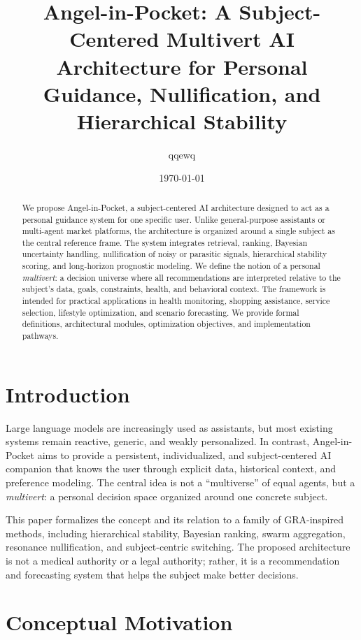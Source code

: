 \documentclass[11pt,a4paper]{article}
\title{Angel-in-Pocket: A Subject-Centered Multivert AI Architecture for Personal Guidance, Nullification, and Hierarchical Stability}
\author{qqewq}
\date{\today}
\begin{document}
\maketitle

\begin{abstract}
We propose Angel-in-Pocket, a subject-centered AI architecture designed to act as a personal guidance system for one specific user. Unlike general-purpose assistants or multi-agent market platforms, the architecture is organized around a single subject as the central reference frame. The system integrates retrieval, ranking, Bayesian uncertainty handling, nullification of noisy or parasitic signals, hierarchical stability scoring, and long-horizon prognostic modeling. We define the notion of a personal \emph{multivert}: a decision universe where all recommendations are interpreted relative to the subject's data, goals, constraints, health, and behavioral context. The framework is intended for practical applications in health monitoring, shopping assistance, service selection, lifestyle optimization, and scenario forecasting. We provide formal definitions, architectural modules, optimization objectives, and implementation pathways.
\end{abstract}

\section{Introduction}

Large language models are increasingly used as assistants, but most existing systems remain reactive, generic, and weakly personalized. In contrast, Angel-in-Pocket aims to provide a persistent, individualized, and subject-centered AI companion that knows the user through explicit data, historical context, and preference modeling. The central idea is not a ``multiverse'' of equal agents, but a \emph{multivert}: a personal decision space organized around one concrete subject.

This paper formalizes the concept and its relation to a family of GRA-inspired methods, including hierarchical stability, Bayesian ranking, swarm aggregation, resonance nullification, and subject-centric switching. The proposed architecture is not a medical authority or a legal authority; rather, it is a recommendation and forecasting system that helps the subject make better decisions.

\section{Conceptual Motivation}
\end{document}
